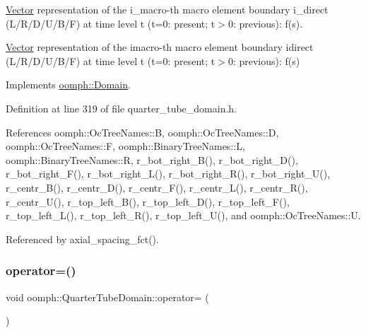 \hyperlink{classoomph_1_1Vector}{Vector} representation of the i\+\_\+macro-\/th macro element boundary i\+\_\+direct (L/\+R/\+D/\+U/\+B/F) at time level t (t=0\+: present; t$>$0\+: previous)\+: f(s). 

\hyperlink{classoomph_1_1Vector}{Vector} representation of the imacro-\/th macro element boundary idirect (L/\+R/\+D/\+U/\+B/F) at time level t (t=0\+: present; t$>$0\+: previous)\+: f(s) 

Implements \hyperlink{classoomph_1_1Domain_a95f3e00d28ea37e6c4d3027bfac91096}{oomph\+::\+Domain}.



Definition at line 319 of file quarter\+\_\+tube\+\_\+domain.\+h.



References oomph\+::\+Oc\+Tree\+Names\+::B, oomph\+::\+Oc\+Tree\+Names\+::D, oomph\+::\+Oc\+Tree\+Names\+::F, oomph\+::\+Binary\+Tree\+Names\+::L, oomph\+::\+Binary\+Tree\+Names\+::R, r\+\_\+bot\+\_\+right\+\_\+\+B(), r\+\_\+bot\+\_\+right\+\_\+\+D(), r\+\_\+bot\+\_\+right\+\_\+\+F(), r\+\_\+bot\+\_\+right\+\_\+\+L(), r\+\_\+bot\+\_\+right\+\_\+\+R(), r\+\_\+bot\+\_\+right\+\_\+\+U(), r\+\_\+centr\+\_\+\+B(), r\+\_\+centr\+\_\+\+D(), r\+\_\+centr\+\_\+\+F(), r\+\_\+centr\+\_\+\+L(), r\+\_\+centr\+\_\+\+R(), r\+\_\+centr\+\_\+\+U(), r\+\_\+top\+\_\+left\+\_\+\+B(), r\+\_\+top\+\_\+left\+\_\+\+D(), r\+\_\+top\+\_\+left\+\_\+\+F(), r\+\_\+top\+\_\+left\+\_\+\+L(), r\+\_\+top\+\_\+left\+\_\+\+R(), r\+\_\+top\+\_\+left\+\_\+\+U(), and oomph\+::\+Oc\+Tree\+Names\+::U.



Referenced by axial\+\_\+spacing\+\_\+fct().

\mbox{\label{classoomph_1_1QuarterTubeDomain_aad4f59dfaa325e7d8a67ed477114700b}} 
\subsubsection{\texorpdfstring{operator=()}{operator=()}}
{\footnotesize\ttfamily void oomph\+::\+Quarter\+Tube\+Domain\+::operator= (\begin{DoxyParamCaption}\item[{const \hyperlink{classoomph_1_1QuarterTubeDomain}{Quarter\+Tube\+Domain} \&}]{ }\end{DoxyParamCaption})\hspace{0.3cm}{\ttfamily [inline]}}



